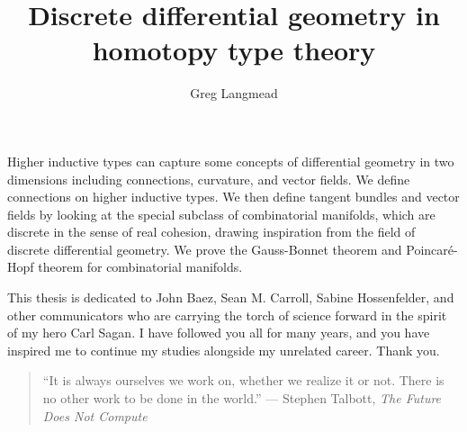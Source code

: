 \documentclass[12pt,fleqn]{article}
\title{Discrete differential geometry in homotopy type theory}
\author{Greg Langmead}
\renewenvironment{abstract}{\section*{\abstractname}}{}
\begin{document}
\maketitle

\begin{abstract}
Higher inductive types can capture some concepts of differential geometry in two dimensions including connections, curvature, and vector fields. We define connections on higher inductive types. We then define tangent bundles and vector fields by looking at the special subclass of combinatorial manifolds, which are discrete in the sense of real cohesion\cite{shulman_cohesion}, drawing inspiration from the field of discrete differential geometry. We prove the Gauss-Bonnet theorem and Poincaré-Hopf theorem for combinatorial manifolds.
\end{abstract}

\begin{dedication}
This thesis is dedicated to John Baez, Sean M. Carroll, Sabine Hossenfelder, and other communicators who are carrying the torch of science forward in the spirit of my hero Carl Sagan. I have followed you all for many years, and you have inspired me to continue my studies alongside my unrelated career. Thank you.

\begin{quote} 
\centering
``It is always ourselves we work on, whether we realize it or not. There is no other work to be done in the world.'' --- Stephen Talbott, \emph{The Future Does Not Compute}\cite{talbott}
\end{quote}
\end{dedication}

\listofchanges[title=Changelist]
\listoftodos
\clearpage


\tableofcontents 
\clearpage

\clearpage

\clearpage

\clearpage

\clearpage

\clearpage

\clearpage
\appendix

\clearpage


\end{document}
